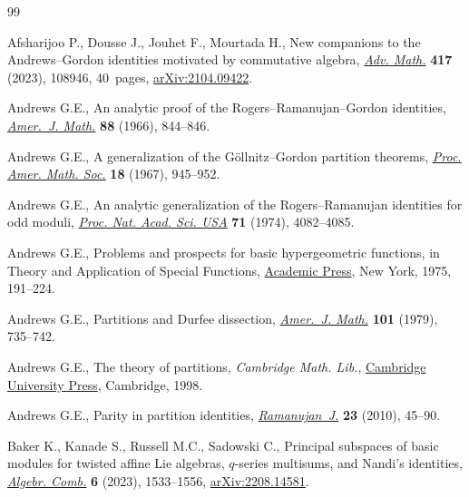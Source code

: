 \documentclass[pdftex]{sigma}
\numberwithin{equation}{section}
\theoremstyle{definition}
\begin{document}
\begin{thebibliography}{99}
\footnotesize\itemsep=0pt

Afsharijoo P., Dousse J., Jouhet F., Mourtada H., New companions to the
 {A}ndrews--{G}ordon identities motivated by commutative algebra,
 \href{https://doi.org/10.1016/j.aim.2023.108946}{\textit{Adv. Math.}}
 \textbf{417} (2023), 108946, 40~pages,
 \href{http://arxiv.org/abs/2104.09422}{arXiv:2104.09422}.

Andrews G.E., An analytic proof of the {R}ogers--{R}amanujan--{G}ordon
 identities, \href{https://doi.org/10.2307/2373082}{\textit{Amer.~J. Math.}}
 \textbf{88} (1966), 844--846.

Andrews G.E., A generalization of the {G}\"{o}llnitz--{G}ordon partition
 theorems, \href{https://doi.org/10.2307/2035143}{\textit{Proc. Amer. Math.
 Soc.}} \textbf{18} (1967), 945--952.

Andrews G.E., An analytic generalization of the {R}ogers--{R}amanujan
 identities for odd moduli,
 \href{https://doi.org/10.1073/pnas.71.10.4082}{\textit{Proc. Nat. Acad. Sci.
 USA}} \textbf{71} (1974), 4082--4085.

Andrews G.E., Problems and prospects for basic hypergeometric functions, in
 Theory and {A}pplication of {S}pecial {F}unctions,
 \href{https://doi.org/10.1016/B978-0-12-064850-4.50008-2}{Academic Press}, New
 York, 1975, 191--224.

Andrews G.E., Partitions and {D}urfee dissection,
 \href{https://doi.org/10.2307/2373804}{\textit{Amer.~J. Math.}} \textbf{101}
 (1979), 735--742.

Andrews G.E., The theory of partitions, \textit{Cambridge Math. Lib.},
 \href{https://doi.org/10.1017/CBO9780511608650}{Cambridge University Press},
 Cambridge, 1998.

Andrews G.E., Parity in partition identities,
 \href{https://doi.org/10.1007/s11139-008-9150-0}{\textit{Ramanujan~J.}}
 \textbf{23} (2010), 45--90.

Baker K., Kanade S., Russell M.C., Sadowski C., Principal subspaces of basic
 modules for twisted affine {L}ie algebras, {$q$}-series multisums, and
 {N}andi's identities, \href{https://doi.org/10.5802/alco.311}{\textit{Algebr.
 Comb.}} \textbf{6} (2023), 1533--1556,
 \href{http://arxiv.org/abs/2208.14581}{arXiv:2208.14581}.


\end{thebibliography}
\end{document}
